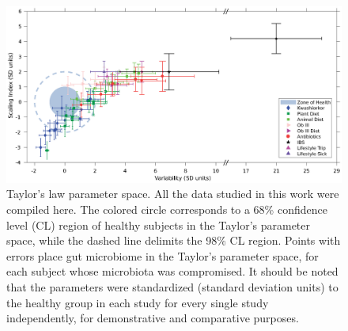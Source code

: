 \begin{figure}
	\centering
	\includegraphics[width=1.0\textwidth]{figs/Fig2.eps}
	\caption{Taylor's law parameter space. All the data studied in this work were compiled here. The colored circle corresponds to a 68\% confidence level (CL) region of healthy subjects in the Taylor's parameter space, while the dashed line delimits the 98\% CL region. Points with errors place gut microbiome in the Taylor's parameter space, for each subject whose microbiota was compromised. It should be noted that the parameters were standardized (standard deviation units) to the healthy group in each study for every single study independently, for demonstrative and comparative purposes.}
	\label{fig:main2}
\end{figure}


